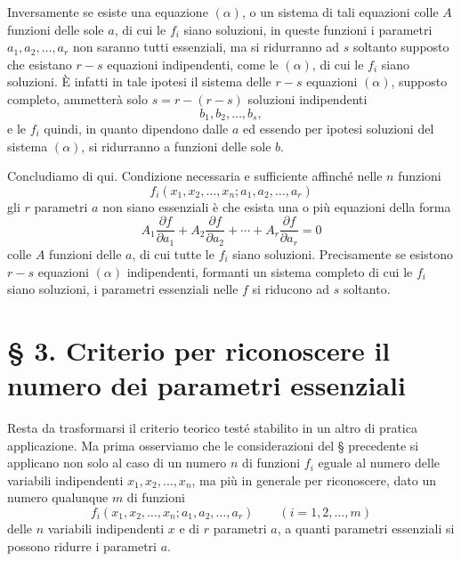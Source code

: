 \documentclass[11pt]{book}
\begin{document}
Inversamente se esiste una equazione $(\alpha)$, o un sistema di tali equazioni colle $A$ funzioni delle sole $a$, di cui le $f_i$ siano soluzioni, in queste funzioni i parametri $a_1,a_2,\ldots,a_r$ non saranno tutti essenziali, ma si ridurranno ad $s$ soltanto supposto che esistano $r-s$ equazioni indipendenti, come le $(\alpha)$, di cui le $f_i$ siano soluzioni. È infatti in tale ipotesi il sistema delle $r-s$ equazioni $(\alpha)$, supposto completo, ammetterà solo $s=r-(r-s)$ soluzioni indipendenti
\[
 b_1,b_2,\ldots,b_s,
\]
e le $f_i$ quindi, in quanto dipendono dalle $a$ ed essendo per ipotesi soluzioni del sistema $(\alpha)$, si ridurranno a funzioni delle sole $b$.

Concludiamo di qui. Condizione necessaria e sufficiente affinché nelle $n$ funzioni
\[
 f_i(x_1,x_2,\ldots,x_n; a_1,a_2,\ldots,a_r)
\]
gli $r$ parametri $a$ non siano essenziali è che esista una o più equazioni della forma
\begin{equation*}\tag{$\alpha$}
 A_1\frac{\partial f}{\partial a_1}+A_2\frac{\partial f}{\partial a_2}+\cdots+A_r\frac{\partial f}{\partial a_r}=0
\end{equation*}
colle $A$ funzioni delle $a$, di cui tutte le $f_i$ siano soluzioni. Precisamente se esistono $r-s$ equazioni $(\alpha)$ indipendenti, formanti un sistema completo di cui le $f_i$ siano soluzioni, i parametri essenziali nelle $f$ si riducono ad $s$ soltanto.

\section*{\S{} 3. Criterio per riconoscere il numero dei parametri essenziali}

Resta da trasformarsi il criterio teorico testé stabilito in un altro di pratica applicazione. Ma prima osserviamo che le considerazioni del \S{} precedente si applicano non solo al caso di un numero $n$ di funzioni $f_i$ eguale al numero delle variabili indipendenti $x_1,x_2,\ldots,x_n$, ma più in generale per riconoscere, dato un numero qualunque $m$ di funzioni
\[
 f_i(x_1,x_2,\ldots,x_n;a_1,a_2,\ldots,a_r)\qquad (i=1,2,\ldots,m)
\]
delle $n$ variabili indipendenti $x$ e di $r$ parametri $a$, a quanti parametri essenziali si possono ridurre i parametri $a$.
\end{document}
